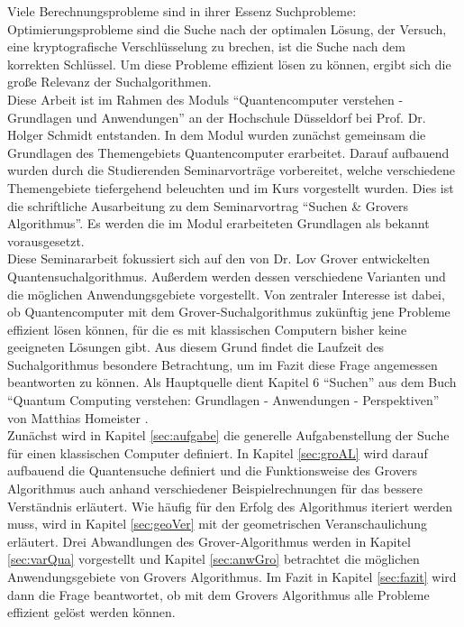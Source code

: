 Viele Berechnungsprobleme sind in ihrer Essenz Suchprobleme: Optimierungsprobleme sind die Suche nach der optimalen Lösung, der Versuch, eine kryptografische Verschlüsselung zu brechen, ist die Suche nach dem korrekten Schlüssel. Um diese Probleme effizient lösen zu können, ergibt sich die große Relevanz der Suchalgorithmen.
\\
Diese Arbeit ist im Rahmen des Moduls “Quantencomputer verstehen - Grundlagen und Anwendungen” an der Hochschule Düsseldorf bei Prof. Dr. Holger Schmidt entstanden. In dem Modul wurden zunächst gemeinsam die Grundlagen des Themengebiets Quantencomputer erarbeitet. Darauf aufbauend wurden durch die Studierenden Seminarvorträge vorbereitet, welche verschiedene Themengebiete tiefergehend beleuchten und im Kurs vorgestellt wurden. Dies ist die schriftliche Ausarbeitung zu dem Seminarvortrag “Suchen \& Grovers Algorithmus”. Es werden die im Modul erarbeiteten Grundlagen als bekannt vorausgesetzt.
\newline
\\
Diese Seminararbeit fokussiert sich auf den von Dr. Lov Grover entwickelten Quantensuchalgorithmus. Außerdem werden dessen verschiedene Varianten und die möglichen Anwendungsgebiete vorgestellt.
Von zentraler Interesse ist dabei, ob Quantencomputer mit dem Grover-Suchalgorithmus zukünftig jene Probleme effizient lösen können, für die es mit klassischen Computern bisher keine geeigneten Lösungen gibt. 
Aus diesem Grund findet die Laufzeit des Suchalgorithmus besondere Betrachtung, um im Fazit diese Frage angemessen beantworten zu können. 
Als Hauptquelle dient Kapitel 6 “Suchen” aus dem Buch “Quantum Computing verstehen: Grundlagen - Anwendungen - Perspektiven” von Matthias Homeister \cite[S. 137 - 167]{Homeister.2018}.
\newline
\\
Zunächst wird in Kapitel \ref{sec:aufgabe} die generelle Aufgabenstellung der Suche für einen klassischen Computer definiert.
In Kapitel \ref{sec:groAL} wird darauf aufbauend die Quantensuche definiert und die Funktionsweise des Grovers Algorithmus auch anhand verschiedener Beispielrechnungen für das bessere Verständnis erläutert.
Wie häufig für den Erfolg des Algorithmus iteriert werden muss, wird in Kapitel \ref{sec:geoVer} mit der geometrischen Veranschaulichung erläutert.
Drei Abwandlungen des Grover-Algorithmus werden in Kapitel \ref{sec:varQua} vorgestellt und Kapitel \ref{sec:anwGro} betrachtet die möglichen Anwendungsgebiete von Grovers Algorithmus.
Im Fazit in Kapitel \ref{sec:fazit} wird dann die Frage beantwortet, ob mit dem Grovers Algorithmus alle Probleme effizient gelöst werden können.